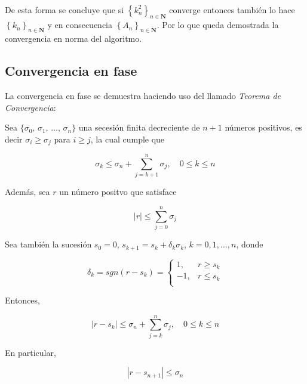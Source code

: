 \

De esta forma se concluye que si $\left\{k_n^2\right\}_{n\in\mathbf{N}}$ converge entonces también lo hace
$\left\{k_n\right\}_{n\in\mathbf{N}}$ y en consecuencia $\left\{A_n\right\}_{n\in\mathbf{N}}$. Por lo que queda demostrada la convergencia en norma del algoritmo.

\subsection{Convergencia en fase}

La convergencia en fase se demuestra haciendo uso del llamado \emph{Teorema de Convergencia}:

\begin{teor}
Sea $\{ \sigma_0, \, \sigma_1 , \,\ldots , \,\sigma_{n}\}$ una secesión finita decreciente de $n+1$ números positivos,
es decir $\sigma_i \ge \sigma_j$ para $i \ge j$, la cual cumple que

\begin{equation}
\sigma_k \le \sigma_{n} + \sum_{j=k+1}^{n}{\sigma_j}, \quad 0 \le k \le n
\end{equation}

Además, sea $r$ un número positvo que satisface

\begin{equation}
|r| \le \sum_{j=0}^{n}{\sigma_j}
\end{equation}

Sea también la sucesión $s_0=0$, $s_{k+1}=s_k + \delta_k\sigma_k$, $k=0,1,\ldots,n$, donde

\begin{equation}
\delta_k=sgn(r-s_k)=\left\{\begin{array}{rcl}
				1, & r \ge s_k\\
				-1, & r \le s_k\\
			\end{array}\right.
\end{equation}

Entonces,

\begin{equation}
|r-s_k| \le \sigma_{n} + \sum_{j=k}^{n}{\sigma_j}, \quad 0 \le k \le n
\end{equation}

En particular,

\begin{equation}
|r-s_{n+1}| \le \sigma_{n}
\end{equation}

\end{teor}

